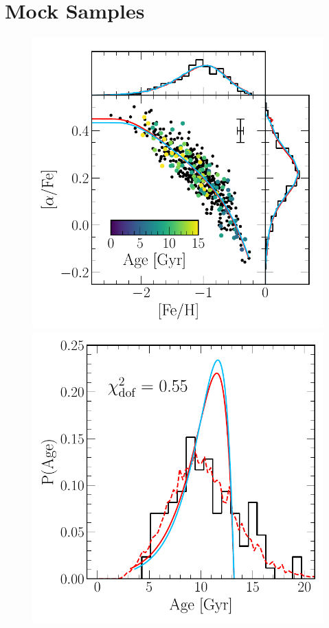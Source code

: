 \documentclass[ms.tex]{subfiles}
\begin{document}
\section{Mock Samples}
\label{sec:mocks}

\begin{figure}
\centering
\includegraphics[scale = 0.5]{fiducial_mock_afe_feh.pdf}
\includegraphics[scale = 0.42]{fiducial_mock_agedist.pdf}

\end{figure}
\end{document}
